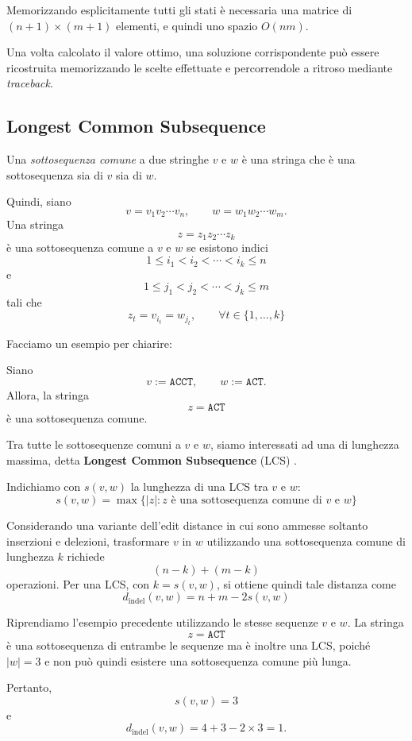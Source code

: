 Memorizzando esplicitamente tutti gli stati
è necessaria una matrice di $(n+1) \times(m+1)$ elementi, e quindi uno spazio $O(nm)$.

Una volta calcolato il valore ottimo, una soluzione corrispondente può essere ricostruita memorizzando le scelte effettuate
e percorrendole a ritroso mediante \emph{traceback}.

\subsection{Longest Common Subsequence}

Una \emph{sottosequenza comune} a due stringhe $v$ e $w$ è una stringa che è una sottosequenza sia di $v$ sia di $w$.

Quindi, siano
\[
    v=v_{1}v_{2} \cdots v_{n}, \qquad w = w_{1}w_{2}\cdots w_{m}.
\]
Una stringa
\[
    z =z_{1}z_{2} \cdots z_{k}
\]
è una sottosequenza comune a $v$ e $w$ se esistono indici
\[
    1 \leq i_{1} < i_{2} < \cdots < i_{k} \leq n
\]
e
\[
    1 \leq j_{1} < j_{2} < \cdots < j_{k} \leq m
\]
tali che
\[
    z_{t} = v_{i_{t}} = w_{j_{t}}, \qquad \forall t \in \{ 1,\ldots,k \}
\]

Facciamo un esempio per chiarire:

Siano
\[
    v:= \texttt{ACCT}, \qquad w:= \texttt{ACT}.
\]
Allora, la stringa
\[
    z= \texttt{ACT}
\]
è una sottosequenza comune.

Tra tutte le sottosequenze comuni a $v$ e $w$, siamo interessati ad una di lunghezza massima, detta \textbf{Longest Common Subsequence} (LCS)
\cite[pp.~172--177]{jones--pevzner}.

Indichiamo con $s(v,w)$ la lunghezza di una LCS tra $v$ e $w$:
\[
    s(v,w) =  \max \{ |z|:z \text{ è una sottosequenza comune di }v \text{ e }w \}
\]

Considerando una variante dell'edit distance in cui sono ammesse soltanto inserzioni e delezioni, trasformare $v$ in $w$
utilizzando una sottosequenza comune di lunghezza $k$ richiede
\[
    (n-k) + (m-k)
\]
operazioni. Per una LCS, con $k=s(v,w)$, si ottiene quindi tale distanza come
\[
    d_{\text{indel}}(v,w) = n + m - 2s(v,w)
\]

Riprendiamo l'esempio precedente utilizzando le stesse sequenze $v$ e $w$.
La stringa
\[
    z=\texttt{ACT}
\]
è una sottosequenza di entrambe le sequenze ma è inoltre una LCS, poiché $|w|=3$ e non può quindi esistere una sottosequenza comune più lunga.

Pertanto,
\[
    s(v,w)=3
\]
e
\[
    d_{\text{indel}}(v,w) = 4 + 3 - 2\times3 = 1.
\]


